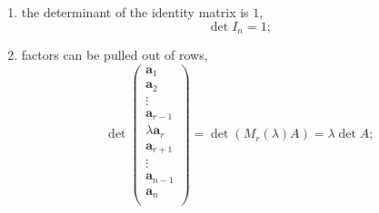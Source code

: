 \begin{enumerate}
    \item the determinant of the identity matrix is $1$, \[\det{I_n}=1;\]
    
    \item factors can be pulled out of rows,
    \[
        \det{
            \begin{pmatrix}
                \bm a_1\\
                \bm a_2\\
                \vdots\\
                \bm a_{r-1}\\
                \lambda\bm a_r\\
                \bm a_{r+1}\\
                \vdots\\
                \bm a_{n-1}\\
                \bm a_n\\
            \end{pmatrix}
        }
        =\det{(M_r(\lambda)A)}=\lambda\det{A};
    \]
    

\end{enumerate}
